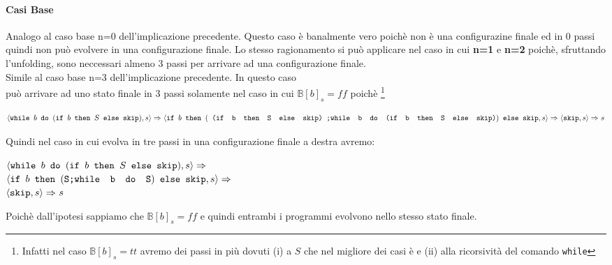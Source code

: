 {    \paragraph{Casi Base}
    
    
	 Analogo al caso base n=0 dell'implicazione precedente. Questo
	caso è banalmente vero poichè \exFourRS{} non è una configurazine finale ed
	in 0 passi quindi non può evolvere in una configurazione finale. Lo stesso
	ragionamento si può applicare nel caso in cui \textbf{n=1} e \textbf{n=2}
	poichè, sfruttando l'unfolding, sono neccessari almeno 3 passi per arrivare
	ad una configurazione finale.\\

	 Simile al caso base n=3 dell'implicazione precedente. In
	questo caso \\ \exFourRS{} può arrivare ad uno stato finale
	in 3 passi solamente nel caso in cui $\mathbb{B}[b]_s=ff$ poichè
	\footnote{Infatti nel caso $\mathbb{B}[b]_s=tt$ avremo dei passi in più 
	dovuti (i) a $S$ che nel migliore dei casi è \skipistr{} e (ii) alla
	ricorsività del comando \texttt{while}}
	
\[ 	\exFourRS\Rar{}
	\confSs{
		\ifABC{b}
			{(\concat{
				(\ifABC{b}{S}{\skipistr})
			}{\wbS{b}{(\ifABC{b}{S}{\skipistr})}{}})}
			{\skipistr}
	}{s}\Rar{}
	\confSs{\skipistr}{s}\Rar{}s \]

	Quindi nel caso in cui \exFourRS{} evolva in tre passi in una
	configurazione finale a destra avremo:
	\begin{center}
	$\confSs{\wbS{b}{(\ifABC{b}{S}{\skipistr})}}{s}\Rar{}$\\
	$\confSs{
		\ifABC{b}{(\concat{S}{\wbS{b}{S}})}{\skipistr}
	}{s}\Rar{}$\\
	$\confSs{\skipistr}{s}\Rar{}s$
	\end{center}
	Poichè dall'ipotesi sappiamo che $\mathbb{B}[b]_s=ff$ e quindi entrambi i programmi evolvono nello stesso stato finale.\\
}
